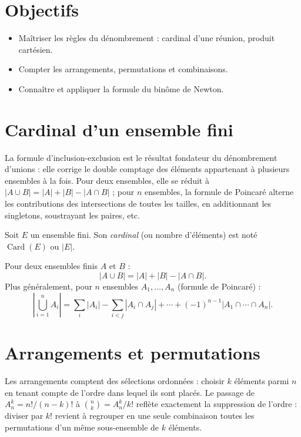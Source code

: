 \documentclass[11pt,a4paper,twoside]{book}
\DeclareMathOperator{\Card}{Card}
\begin{document}
\section*{Objectifs}
\begin{itemize}[leftmargin=1.5em]
  \item Maîtriser les règles du dénombrement : cardinal d'une réunion, produit cartésien.
  \item Compter les arrangements, permutations et combinaisons.
  \item Connaître et appliquer la formule du binôme de Newton.
\end{itemize}

\section{Cardinal d'un ensemble fini}

La formule d'inclusion-exclusion est le résultat fondateur du dénombrement d'unions : elle corrige le double comptage des éléments appartenant à plusieurs ensembles à la fois. Pour deux ensembles, elle se réduit à $|A \cup B| = |A| + |B| - |A \cap B|$ ; pour $n$ ensembles, la formule de Poincaré alterne les contributions des intersections de toutes les tailles, en additionnant les singletons, soustrayant les paires, etc.

\begin{definitionbox}[Cardinal]
Soit $E$ un ensemble fini. Son \emph{cardinal} (ou nombre d'éléments) est noté $\Card(E)$ ou $|E|$.
\end{definitionbox}

\begin{theoremebox}
Pour deux ensembles finis $A$ et $B$ :
\[
  |A \cup B| = |A| + |B| - |A \cap B|.
\]
Plus généralement, pour $n$ ensembles $A_1, \ldots, A_n$ (formule de Poincaré) :
\[
  \left|\bigcup_{i=1}^n A_i\right| = \sum_i |A_i| - \sum_{i<j}|A_i \cap A_j| + \cdots + (-1)^{n-1}|A_1 \cap \cdots \cap A_n|.
\]
\end{theoremebox}

\section{Arrangements et permutations}

Les arrangements comptent des sélections ordonnées : choisir $k$ éléments parmi $n$ en tenant compte de l'ordre dans lequel ils sont placés. Le passage de $A_n^k = n!/(n-k)!$ à $\binom{n}{k} = A_n^k/k!$ reflète exactement la suppression de l'ordre : diviser par $k!$ revient à regrouper en une seule combinaison toutes les permutations d'un même sous-ensemble de $k$ éléments.
\end{document}
